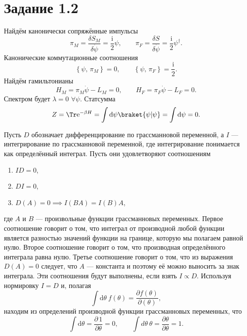 \documentclass[a4paper, 14pt]{extarticle}
\begin{document}
\section*{Задание 1.2}
\begin{hiProb}[Задача 1]
\end{hiProb}
\begin{sol}
Найдём канонически сопряжённые импульсы
\[
	\pi_M= \frac{\delta S_M}{\delta\dot{\psi}}=
	\frac{\mathrm{i} }{2}\psi,\qquad
	\pi_F= \frac{\delta S}{\delta \dot{\psi}}=
	\frac{\mathrm{i} }{2} \psi^\dagger
.\] 
Канонические коммутационные соотношения
\[
\left\{ \psi,\,\pi_M \right\} =0,\qquad
\left\{ \psi,\,\pi_F \right\} =\frac{\mathrm{i} }{2}
.\] 
Найдём гамильтонианы
\[
H_M= \pi_M \dot{\psi}-L_M=0,\qquad
H_F=\pi_F \dot{\psi}-L_F=0
.\] 
Спектром будет $\lambda=0$ $\forall \psi$. Статсумма
\[
Z= \Tr \mathrm{e} ^{-\beta H}= \int \mathrm{d} \psi \braket{\psi|\psi} = \int \mathrm{d} \psi=0
.\] 
\end{sol}
\begin{hiProb}[Задача 2]
\end{hiProb}
\begin{sol}
Пусть $D$ обозначает дифференцирование по грассманновой
переменной, а $I$ --- интегрирование по грассманновой
переменной, где интегрирование понимается как определённый
интеграл. Пусть они удовлетворяют соотношениям
\renewcommand{\labelenumi}{(\arabic{enumi})}
\begin{enumerate}
\item $ID=0$,
\item $DI=0$,
\item $D(A)=0 \implies I(BA)=I(B)A$,
\end{enumerate}
где  $A$ и $B$ --- произвольные функции  грассманновых
переменных. Первое соотношение говорит о том, что
интеграл от производной любой функции является разностью
значений функции на границе, которую мы полагаем
равной нулю. Второе соотношение говорит о том, что
производная определённого интеграла равна нулю. Третье
соотношение говорит о том, что из выражения $D(A)=0$ 
следует, что $ A$ --- константа и поэтому её можно 
выносить за знак интеграла. Эти соотношения будут
выполнены, если взять $I \propto D$. Используя нормировку
$I=D$ и, полагая
\[
	\int \mathrm{d} \theta\  f(\theta)= \frac{\partial f(\theta)}{\partial(\theta)}
,\] 
находим из определений производной функции грассманновых
переменных, что
\[
\int \mathrm{d} \theta=\frac{\partial \,1}{\partial \theta} 
=0,\qquad
\int d\theta\ \theta=\frac{\partial \theta}{\partial \theta} =1
.\] 
\end{sol}
\end{document}
